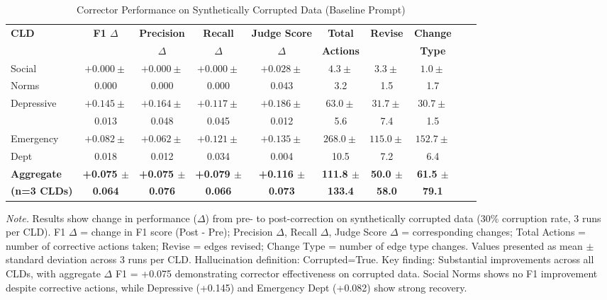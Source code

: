 \documentclass{article}
\begin{document}
\begin{table}[H]
\centering
\caption{Corrector Performance on Synthetically Corrupted Data (Baseline Prompt)}
\label{tab:rq1b_synthetic_correctness}
\begin{threeparttable}
\begin{tabular}{lccccccccc}
\toprule
\textbf{CLD} & \textbf{F1 $\Delta$} & \textbf{Precision} & \textbf{Recall} & \textbf{Judge Score} & \textbf{Total} & \textbf{Revise} & \textbf{Change} \\
 & & \textbf{$\Delta$} & \textbf{$\Delta$} & \textbf{$\Delta$} & \textbf{Actions} & & \textbf{Type} \\
\midrule
Social        & $+0.000 \pm$ & $+0.000 \pm$ & $+0.000 \pm$ & $+0.028 \pm$ & $4.3 \pm$ & $3.3 \pm$ & $1.0 \pm$ \\
Norms         & 0.000 & 0.000 & 0.000 & 0.043 & 3.2 & 1.5 & 1.7 \\
\midrule
Depressive    & $+0.145 \pm$ & $+0.164 \pm$ & $+0.117 \pm$ & $+0.186 \pm$ & $63.0 \pm$ & $31.7 \pm$ & $30.7 \pm$ \\
              & 0.013 & 0.048 & 0.045 & 0.012 & 5.6 & 7.4 & 1.5 \\
\midrule
Emergency     & $+0.082 \pm$ & $+0.062 \pm$ & $+0.121 \pm$ & $+0.135 \pm$ & $268.0 \pm$ & $115.0 \pm$ & $152.7 \pm$ \\
Dept          & 0.018 & 0.012 & 0.034 & 0.004 & 10.5 & 7.2 & 6.4 \\
\midrule
\textbf{Aggregate}  & \textbf{+0.075 $\pm$} & \textbf{+0.075 $\pm$} & \textbf{+0.079 $\pm$} & \textbf{+0.116 $\pm$} & \textbf{111.8 $\pm$} & \textbf{50.0 $\pm$} & \textbf{61.5 $\pm$} \\
\textbf{(n=3 CLDs)} & \textbf{0.064} & \textbf{0.076} & \textbf{0.066} & \textbf{0.073} & \textbf{133.4} & \textbf{58.0} & \textbf{79.1} \\
\bottomrule
\end{tabular}
\begin{tablenotes}
\small
\item \textit{Note.} Results show change in performance ($\Delta$) from pre- to post-correction on synthetically corrupted data (30\% corruption rate, 3 runs per CLD). 
F1 $\Delta$ = change in F1 score (Post - Pre); Precision $\Delta$, Recall $\Delta$, Judge Score $\Delta$ = corresponding changes; 
Total Actions = number of corrective actions taken; Revise = edges revised; Change Type = number of edge type changes. 
Values presented as mean $\pm$ standard deviation across 3 runs per CLD. 
Hallucination definition: Corrupted=True. 
Key finding: Substantial improvements across all CLDs, with aggregate $\Delta$ F1 = +0.075 demonstrating corrector effectiveness on corrupted data. Social Norms shows no F1 improvement despite corrective actions, while Depressive (+0.145) and Emergency Dept (+0.082) show strong recovery.
\end{tablenotes}
\end{threeparttable}
\end{table}
\end{document}
